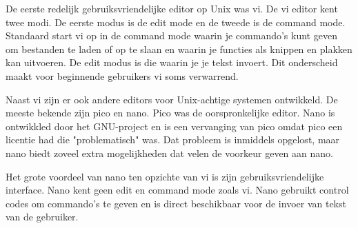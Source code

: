 De eerste redelijk gebruiksvriendelijke editor op Unix was vi. De vi editor kent twee modi. De eerste modus is de edit mode en de tweede is de command mode. Standaard start vi op in de command mode waarin je commando's kunt geven om bestanden te laden of op te slaan en waarin je functies als knippen en plakken kan uitvoeren. De edit modus is die waarin je je tekst invoert. Dit onderscheid maakt voor beginnende gebruikers vi soms verwarrend.

Naast vi zijn er ook andere editors voor Unix-achtige systemen ontwikkeld. De meeste bekende zijn pico en nano. Pico was de oorspronkelijke editor. Nano is ontwikkled door het GNU-project en is een vervanging van pico omdat pico een licentie had die "problematisch" was. Dat probleem is inmiddels opgelost, maar nano biedt zoveel extra mogelijkheden dat velen de voorkeur geven aan nano.

Het grote voordeel van nano ten opzichte van vi is zijn gebruiksvriendelijke interface. Nano kent geen edit en command mode zoals vi. Nano gebruikt control codes om commando's te geven en is direct beschikbaar voor de invoer van tekst van de gebruiker.
